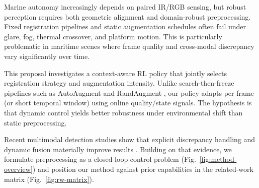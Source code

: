 Marine autonomy increasingly depends on paired IR/RGB sensing, but robust perception requires both geometric alignment and domain-robust preprocessing. Fixed registration pipelines and static augmentation schedules often fail under glare, fog, thermal crossover, and platform motion. This is particularly problematic in maritime scenes where frame quality and cross-modal discrepancy vary significantly over time.

This proposal investigates a context-aware RL policy that jointly selects registration strategy and augmentation intensity. Unlike search-then-freeze pipelines such as AutoAugment and RandAugment \cite{cubuk2019autoaugment,cubuk2020randaugment}, our policy adapts per frame (or short temporal window) using online quality/state signals. The hypothesis is that dynamic control yields better robustness under environmental shift than static preprocessing.

Recent multimodal detection studies show that explicit discrepancy handling and dynamic fusion materially improve results \cite{vadidar2022unified,li2023adcnet,li2024fd2net}. Building on that evidence, we formulate preprocessing as a closed-loop control problem (Fig.~\ref{fig:method-overview}) and position our method against prior capabilities in the related-work matrix (Fig.~\ref{fig:rw-matrix}).
